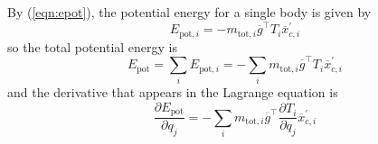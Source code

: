 \documentclass[a4paper]{article}
\begin{document}
By (\ref{eqn:epot}), the potential energy for a single body is given by
\begin{equation}
E_{\mathrm{pot},i} = - m_{\mathrm{tot},i} \overline{g}^\top T_i \overline{x}_{c,i}^\prime
\end{equation}
so the total potential energy is
\begin{equation}
E_\mathrm{pot} = \sum_i E_{\mathrm{pot},i} = - \sum_i m_{\mathrm{tot},i} \overline{g}^\top T_i \overline{x}_{c,i}^\prime
\end{equation}
and the derivative that appears in the Lagrange equation is
\begin{equation}
\frac{\partial E_\mathrm{pot}}{\partial q_j} = - \sum_i m_{\mathrm{tot},i} \overline{g}^\top \frac{\partial T_i}{\partial q_j} \overline{x}_{c,i}^\prime
\end{equation}
\end{document}
